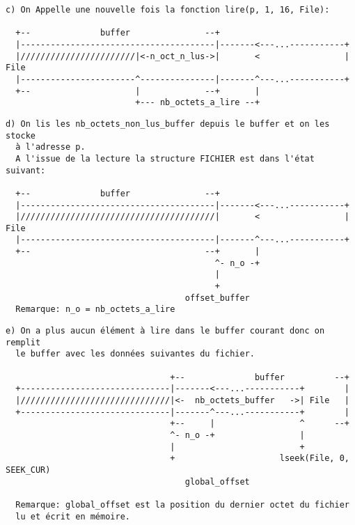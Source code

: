\documentclass[11pt]{article}
\theoremstyle{definition}
\theoremstyle{definition}
\begin{document}
  \begin{lstlisting}[columns=fixed,basicstyle=\scriptsize\ttfamily]
  c) On Appelle une nouvelle fois la fonction lire(p, 1, 16, File):

  +--              buffer               --+
  |---------------------------------------|-------<---...-----------+
  |///////////////////////|<-n_oct_n_lus->|       <                 | File
  |-----------------------^---------------|-------^---...-----------+
  +--                     |             --+       |
                          +--- nb_octets_a_lire --+

\end{lstlisting}

\begin{lstlisting}[columns=fixed,basicstyle=\scriptsize\ttfamily]
  d) On lis les nb_octets_non_lus_buffer depuis le buffer et on les stocke
  à l'adresse p.
  A l'issue de la lecture la structure FICHIER est dans l'état suivant:

  +--              buffer               --+
  |---------------------------------------|-------<---...-----------+
  |///////////////////////////////////////|       <                 | File
  |---------------------------------------|-------^---...-----------+
  +--                                   --+       |
                                          ^- n_o -+
                                          |
                                          +
                                    offset_buffer
  Remarque: n_o = nb_octets_a_lire
\end{lstlisting}

\begin{lstlisting}[columns=fixed,basicstyle=\scriptsize\ttfamily]
  e) On a plus aucun élément à lire dans le buffer courant donc on remplit
  le buffer avec les données suivantes du fichier.

                                 +--              buffer          --+
  +------------------------------|-------<---...-----------+        |
  |//////////////////////////////|<-  nb_octets_buffer   ->| File   |
  +------------------------------|-------^---...-----------+        |
                                 +--     |                 ^      --+
                                 ^- n_o -+                 |
                                 |                         +
                                 +                     lseek(File, 0, SEEK_CUR)
                                    global_offset

  Remarque: global_offset est la position du dernier octet du fichier
  lu et écrit en mémoire.
\end{lstlisting}
\end{document}
